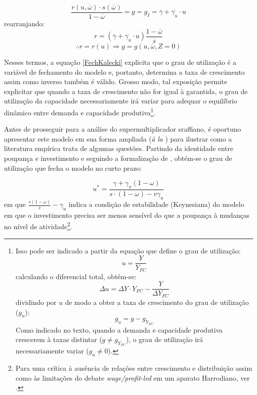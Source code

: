 $$
\frac{r(u, \overline{\omega})\cdot s(\overline{\omega})}{1 - \overline{\omega}} = g = g_I = \overline{\gamma} + \overline{\gamma_u}\cdot u
$$
rearranjando:
$$
r = \left(\overline{\gamma} + \overline{\gamma_u}\cdot u \right)\frac{1-\overline{\omega}}{\overline{s}}
$$
\begin{equation}
\label{FechKalecki}
    \therefore r = r(u) \Rightarrow g = g(u, \overline{\omega}, Z = 0)
\end{equation}

Nesses termos, a equação \ref{FechKalecki} explicita que o grau de utilização é a variável de fechamento do modelo e, portanto, determina a taxa de crescimento assim como inverso também é válido. Grosso modo, tal exposição permite explicitar que quando a taxa de crescimento não for igual à garantida, o grau de utilização da capacidade necessariamente irá variar para adequar o equilíbrio dinâmico entre demanda e capacidade produtiva\footnote{Isso pode ser indicado a partir da equação que define o grau de utilização:
$$
u = \frac{Y}{Y_{FC}}
$$
calculando o diferencial total, obtém-se:
$$
\Delta u = \Delta Y\cdot Y_{FC} - \frac{Y}{\Delta Y_{FC}}
$$
dividindo por $u$ de modo a obter a taxa de crescimento do grau de utilização ($g_u$):
$$
g_u = g - g_{Y_{FC}}
$$
Como indicado no texto, quando a demanda e capacidade produtiva crescerem à taxas distintar ($g \neq g_{Y_{FC}}$), o grau de utilização irá necessariamente variar ($g_u \neq 0$).
}.

Antes de prosseguir para a análise do supermultiplicador sraffiano, é oportuno apresentar este modelo em sua forma ampliada (\textit{à la} \textcite{bhaduri_unemployment_1990}) para ilustrar como a literatura empírica trata de algumas questões. Partindo da identidade entre poupança e investimento e seguindo a formalização de \textcite[Cap, 6]{lavoie_post-keynesian_2015}, obtém-se o grau de utilização que fecha o modelo no curto prazo:

\begin{equation}
\label{KaleckiSR}
    u^{*} = \frac{\gamma + \gamma_{\pi}(1-\omega)}{s\cdot (1-\omega) - v\gamma_u}
\end{equation}
em que $\frac{s(1-\omega)}{v} - \gamma_u$ indica a condição de estabilidade (Keynesiana) do modelo em que o investimento precisa ser menos sensível do que a poupança à mudanças no nível de atividade\footnote{Para uma crítica à ausência de relações entre crescimento e distribuição assim como às limitações do debate \textit{wage/profit-led} em um aparato
Harrodiano, 
ver 
\textcite{skott_weaknesses_2017}.}.

